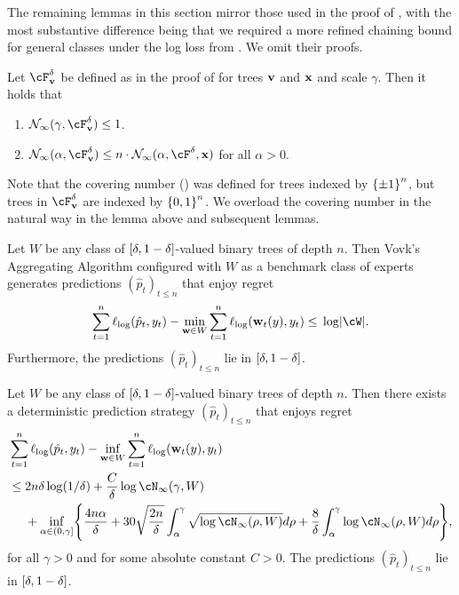 The remaining lemmas in this section mirror those used in the proof of , with the most substantive difference being that we required a more refined chaining bound for general classes under the log loss from \cite{RakSri15}. We omit their proofs.

\begin{lemma}
\label{lem:fv_properties_logloss}
Let $\cF_{\vv}^{\delta}$ be defined as in the proof of  for trees $\mathbf{v}$ and $\mathbf{x}$ and scale $\gamma$. Then it holds that
\begin{enumerate}
\item $\mathcal{N}_{\infty}(\gamma, \cF_{\vv}^{\delta} ) \leq{} 1$.
\item $\mathcal{N}_{\infty}(\alpha, \cF^{\delta}_{\vv} ) \leq{} n\cdot{}\mathcal{N}_{\infty}(\alpha, \cF^{\delta}, \x )$ for all $\alpha>0$.
\end{enumerate}
\end{lemma}
Note that the covering number () was defined for trees indexed by $\left\{\pm{}1\right\}^{n}$, but trees in $\cF_{\vv}^{\delta}$ are indexed by $\left\{0,1\right\}^{n}$. We overload the covering number in the natural way in the lemma above and subsequent lemmas.

\begin{lemma}
  \label{lem:vovk_logloss}
  Let $W$ be any class of $\left[\delta,1-\delta\right]$-valued binary trees of depth $n$. Then Vovk's Aggregating Algorithm configured with $W$ as a benchmark class of experts generates predictions $(\hat{p}_t)_{t\leq{}n}$ that enjoy regret
  \begin{equation}
    \label{eq:logistic_finite}
    \sum_{t=1}^{n}\logloss(\hat{p}_t, y_t) - \min_{\ww\in{}W}\sum_{t=1}^{n}\logloss(\ww_{t}(y), y_t) \leq{} \log\abs*{\cW}.
  \end{equation}
  Furthermore, the predictions $(\hat{p}_t)_{t\leq{}n}$ lie in $\left[\delta,1-\delta\right]$.
\end{lemma}

\begin{lemma}
  \label{lem:logloss_covering}
  Let $W$ be any class of $\left[\delta,1-\delta\right]$-valued binary trees of depth $n$. Then there exists a deterministic prediction strategy $(\hat{p}_t)_{t\leq{}n}$ that enjoys regret
  \begin{align*}
    &\sum_{t=1}^{n}\logloss(\hat{p}_t, y_t) - \inf_{\ww\in{}W}\sum_{t=1}^{n}\logloss(\ww_{t}(y), y_t) \\
    &\leq{}
    2n\delta\log(1/\delta)
    + \frac{C}{\delta}\log\cN_{\infty}(\gamma, W) \\ 
    &~~~~+ \inf_{\alpha\in(0, \gamma]}\crl*{
      \frac{4n\alpha}{\delta} + 30\sqrt{\frac{2n}{\delta}}\int_{\alpha}^{\gamma}\sqrt{\log\cN_{\infty}(\rho,W)}d\rho
      + \frac{8}{\delta}\int_{\alpha}^{\gamma}\log\cN_{\infty}(\rho,W)d\rho
      },
  \end{align*}
  for all $\gamma>0$ and for some absolute constant $C>0$. The predictions $(\hat{p}_t)_{t\leq{}n}$ lie in $\left[\delta,1-\delta\right]$.
\end{lemma}

